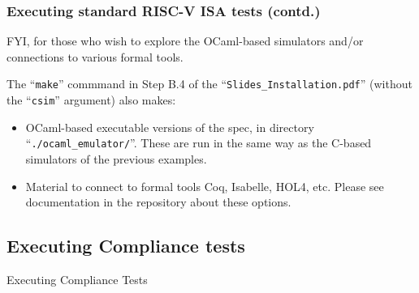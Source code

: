 \documentclass[aspectratio=169]{beamer}
\newcommand{\slidefont}{\scriptsize}
\newcommand{\cf}{\scriptsize\tt}
\begin{document}

\begin{frame}[fragile]
  \frametitle{Executing standard RISC-V ISA tests (contd.)}

  \slidefont

  FYI, for those who wish to explore the OCaml-based simulators and/or
  connections to various formal tools.

  \vspace{5ex}

  The ``{\cf make}'' commmand in Step B.4 of the
  ``{\tt Slides\_Installation.pdf}'' (without the ``{\tt csim}''
  argument) also makes:

  \begin{itemize}
    \item OCaml-based executable versions of the spec, in directory
      ``{\tt ./ocaml\_emulator/}''.  These are run in the same way as
      the C-based simulators of the previous examples.

    \item Material to connect to formal tools Coq, Isabelle, HOL4,
      etc.  Please see documentation in the repository about these
      options.

  \end{itemize}

\end{frame}


\subsection{Executing Compliance tests}


\begin{frame}[fragile]

  \slidefont

  \vfill

  \begin{center}\LARGE
    Executing Compliance Tests
  \end{center}

  \vfill

\end{frame}

\end{document}
